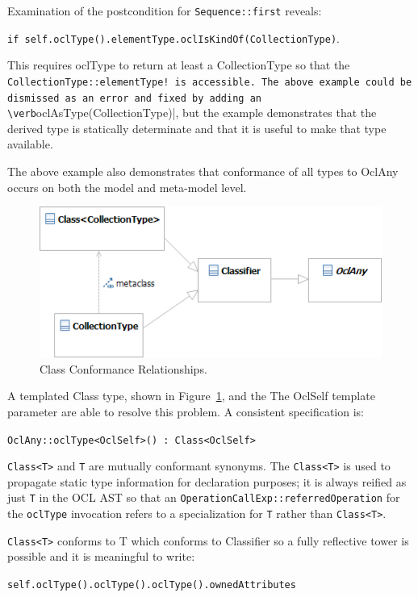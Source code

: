 \documentclass{eceasst}
\begin{document}
Examination of the postcondition for \verb|Sequence::first| reveals:

\verb|if self.oclType().elementType.oclIsKindOf(CollectionType)|. 

This requires oclType to return at least a CollectionType so that the \verb|CollectionType::elementType! is accessible. The above example could be dismissed as an error and fixed by adding an \verb|oclAsType(CollectionType)|, but the example demonstrates that the derived type is statically determinate and that it is useful to make that type available.

The above example also demonstrates that conformance of all types to OclAny occurs on  both the model and meta-model level.

\begin{figure}
  \begin{center}
    \includegraphics[width=4.5in]{Class.png}
  \end{center}
  \caption{Class Conformance Relationships.}
  \label{fig:Class}
\end{figure}

A templated Class type, shown in Figure~\ref{fig:Class},  and the The OclSelf template parameter are able to resolve this problem. A consistent specification is:

\verb!OclAny::oclType<OclSelf>() : Class<OclSelf>!

\verb!Class<T>! and \verb!T! are mutually conformant synonyms. The \verb!Class<T>! is used to propagate static type information for declaration purposes; it is always reified as just \verb!T! in the OCL AST so that an \verb!OperationCallExp::referredOperation! for the \verb!oclType! invocation refers to a specialization for \verb!T! rather than \verb!Class<T>!.

\verb!Class<T>! conforms to T which conforms to Classifier so a fully reflective tower is possible and it is meaningful to write:

 \verb!self.oclType().oclType().oclType().ownedAttributes!
\end{document}
